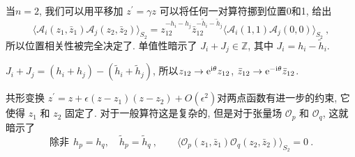 当$n=2$, 我们可以用平移加 $z^{\prime}=\gamma z$ 可以将任何一对算符挪到位置0和1, 给出
\begin{equation}
	\bigl\langle\mathscr{A}_{i}(z_{1}, \bar{z}_{1}) \mathscr{A}_{j}(z_{2}, \bar{z}_{2})\bigr\rangle_{S_{2}}
	=z_{12}^{-h_{i}-h_{j}} \bar{z}_{12}^{-\tilde{h}_{i}-\tilde{h}_{j}}
	\bigl\langle\mathscr{A}_{i}(1,1) \mathscr{A}_{j}(0,0)\bigr\rangle_{S_{2}} \:, \label{6.7.4}
\end{equation}
所以位置相关性被完全决定了. 单值性暗示了 $J_{i}+J_{j} \in \mathds{Z}$, 其中 $J_{i}=h_{i}-\tilde{h}_{i} $.
\begin{tcolorbox}
	\begin{remark}
		$J_{i}+J_{j}=(h_{i}+h_{j})-(\tilde{h}_{i}+\tilde{h}_{j})$, 所以$z_{12} \rightarrow \mathrm{e}^{\mathrm{i} \theta} z_{12}$, $\bar{z}_{12}\rightarrow \mathrm{e}^{-\mathrm{i} \theta} \bar{z}_{12}$\:.
	\end{remark}
\end{tcolorbox}
\noindent 共形变换 $z^{\prime}=z+\epsilon(z-z_{1})(z-z_{2})+O(\epsilon^{2})$对两点函数有进一步的约束, 它使得 $z_{1}$ 和 $z_{2}$ 固定了. 
对于一般算符这是复杂的, 但是对于张量场 $\mathcal{O}_{p}$ 和 $\mathcal{O}_{q}$, 这就暗示了
\begin{equation}
	\text{除非}\:\: h_{p}=h_{q}, \quad \tilde{h}_{p}=\tilde{h}_{q}\:, \qquad 
	\bigl\langle\mathcal{O}_{p}(z_{1}, \bar{z}_{1}) \mathcal{O}_{q}(z_{2}, \bar{z}_{2})\bigr\rangle_{S_{2}}=0 \:. \label{6.7.5}
\end{equation}

